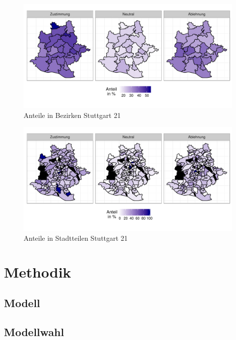 \documentclass{Vorlage}
\begin{document}
\begin{figure}[h]
 \begin{center}
 \includegraphics[scale=0.8]{Pictures/BStuttgart3}
 \caption{Anteile in Bezirken Stuttgart 21}
 \label{BStuttgart21}
 \end{center}
\end{figure}

\begin{figure}[h]
 \begin{center}
 \includegraphics[scale=0.8]{Pictures/SStuttgart3}
 \caption{Anteile in Stadtteilen Stuttgart 21}
 \label{SStuttgart21}
 \end{center}
\end{figure}

\section{Methodik}

\subsection{Modell}

\subsection{Modellwahl}
\end{document}
